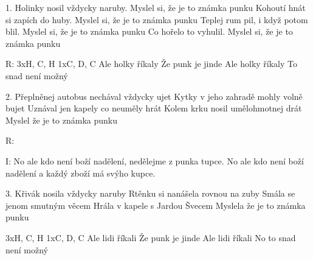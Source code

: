 \resetVars
{}
\MakeHeader
\Lyrics

1. Holinky nosil vždycky naruby. Myslel si, že je to známka punku
Kohoutí hnát si zapích do huby. Myslel si, že je to známka punku
Teplej rum pil, i když potom blil. Myslel si, že je to známka punku
Co hořelo to vyhulil. Myslel si, že je to známka punku


R: 3xH, C, H 1xC, D, C
Ale holky říkaly
Že punk je jinde
Ale holky říkaly
To snad není možný

2. Přeplněnej autobus nechával vždycky ujet
Kytky v jeho zahradě mohly volně bujet
Uznával jen kapely co neuměly hrát
Kolem krku nosil umělohmotnej drát
Myslel že je to známka punku

R:

I: No ale kdo není boží nadělení, nedělejme z punka tupce.
No ale kdo není boží nadělení a každý zboží má svýho kupce.

3. Křivák nosila vždycky naruby
Rtěnku si nanášela rovnou na zuby
Smála se jenom smutným věcem
Hrála v kapele s Jardou Švecem
Myslela že je to známka punku

3xH, C, H 1xC, D, C
Ale lidi říkali
Že punk je jinde
Ale lidi říkali
No to snad není možný

\Next

